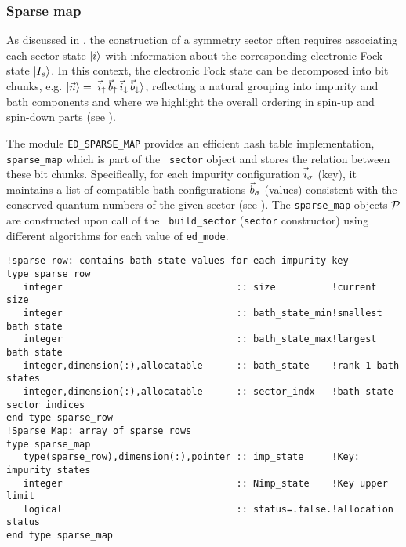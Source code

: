 \documentclass[edipack_sp.tex]{subfiles}
\begin{document}
\subsubsection{Sparse map}\label{CodeSparseMap}
As discussed in , the construction of a symmetry 
sector often requires associating each sector state $|i\rangle$ with 
information about the corresponding electronic Fock state $|I_e\rangle$. 
In this context, the electronic Fock state can be decomposed into bit chunks, 
e.g. $|\vec{n}\rangle = |\vec{i}_\uparrow\,\vec{b}_\uparrow\,
\vec{i}_\downarrow\,\vec{b}_\downarrow\rangle$, reflecting a natural grouping into impurity 
and bath components and where we highlight the overall ordering in
spin-up and spin-down parts (see ).

The module {\tt ED\_SPARSE\_MAP} provides an efficient hash table 
implementation, {\tt sparse\_map} which is part of the {\tt
  sector} object and stores the relation between these bit chunks. 
Specifically, for each impurity configuration 
$\vec{i}_\sigma$ (key), it maintains a list of compatible bath 
configurations $\vec{b}_\sigma$ (values) consistent with the conserved 
quantum numbers of the given sector (see ).
The {\tt sparse\_map} objects ${\cal P}$ are constructed upon call of the {\tt
  build\_sector} ({\tt sector} constructor) using different algorithms 
for each value of {\tt ed\_mode}.


\begin{lstlisting}[style=fstyle,numbers=none]
!sparse row: contains bath state values for each impurity key 
type sparse_row
   integer                               :: size          !current size
   integer                               :: bath_state_min!smallest bath state
   integer                               :: bath_state_max!largest bath state
   integer,dimension(:),allocatable      :: bath_state    !rank-1 bath states
   integer,dimension(:),allocatable      :: sector_indx   !bath state sector indices
end type sparse_row
!Sparse Map: array of sparse rows 
type sparse_map
   type(sparse_row),dimension(:),pointer :: imp_state     !Key: impurity states
   integer                               :: Nimp_state    !Key upper limit 
   logical                               :: status=.false.!allocation status
end type sparse_map
\end{lstlisting}
\end{document}
